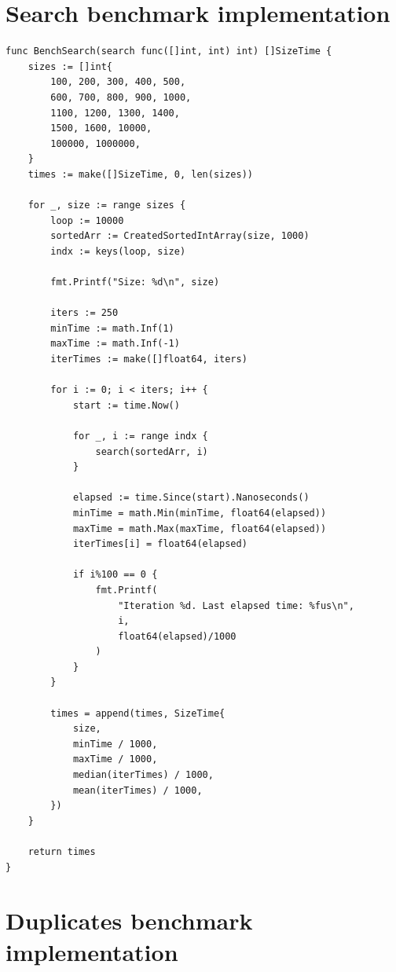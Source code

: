 \documentclass[a4paper,11pt]{article}
\begin{document}
    \begin{appendices}
        \section{Search benchmark implementation}
        \label{appendix:benchmark_search}

        \begin{verbatim}
func BenchSearch(search func([]int, int) int) []SizeTime {
    sizes := []int{
        100, 200, 300, 400, 500,
        600, 700, 800, 900, 1000,
        1100, 1200, 1300, 1400,
        1500, 1600, 10000,
        100000, 1000000,
    }
    times := make([]SizeTime, 0, len(sizes))

    for _, size := range sizes {
        loop := 10000
        sortedArr := CreatedSortedIntArray(size, 1000)
        indx := keys(loop, size)

        fmt.Printf("Size: %d\n", size)

        iters := 250
        minTime := math.Inf(1)
        maxTime := math.Inf(-1)
        iterTimes := make([]float64, iters)

        for i := 0; i < iters; i++ {
            start := time.Now()

            for _, i := range indx {
                search(sortedArr, i)
            }

            elapsed := time.Since(start).Nanoseconds()
            minTime = math.Min(minTime, float64(elapsed))
            maxTime = math.Max(maxTime, float64(elapsed))
            iterTimes[i] = float64(elapsed)

            if i%100 == 0 {
                fmt.Printf(
                    "Iteration %d. Last elapsed time: %fus\n",
                    i,
                    float64(elapsed)/1000
                )
            }
        }

        times = append(times, SizeTime{
            size,
            minTime / 1000,
            maxTime / 1000,
            median(iterTimes) / 1000,
            mean(iterTimes) / 1000,
        })
    }

    return times
}
        \end{verbatim}

        \section{Duplicates benchmark implementation}
        \label{appendix:benchmark_duplicates}


\end{appendices}
\end{document}
